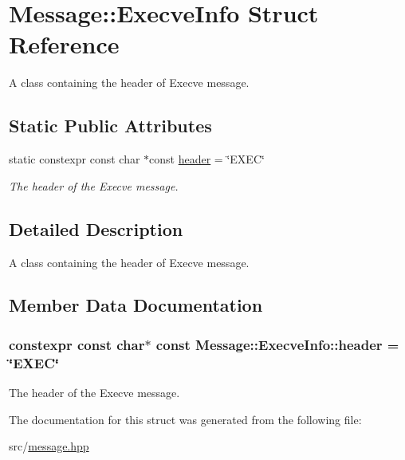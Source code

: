 \hypertarget{struct_message_1_1_execve_info}{\section{Message\-:\-:Execve\-Info Struct Reference}
\label{struct_message_1_1_execve_info}
}


A class containing the header of Execve message.  


\subsection*{Static Public Attributes}
\begin{DoxyCompactItemize}
\item 
static constexpr const char $\ast$const \hyperlink{struct_message_1_1_execve_info_a44d41c7c7b15356bd30404850d8b90f7}{header} = \char`\"{}E\-X\-E\-C\char`\"{}
\begin{DoxyCompactList}\small\item\em The header of the Execve message. \end{DoxyCompactList}\end{DoxyCompactItemize}


\subsection{Detailed Description}
A class containing the header of Execve message. 

\subsection{Member Data Documentation}
\hypertarget{struct_message_1_1_execve_info_a44d41c7c7b15356bd30404850d8b90f7}{
\subsubsection[{header}]{\setlength{\rightskip}{0pt plus 5cm}constexpr const char$\ast$ const Message\-::\-Execve\-Info\-::header = \char`\"{}E\-X\-E\-C\char`\"{}\hspace{0.3cm}{\ttfamily [static]}}}\label{struct_message_1_1_execve_info_a44d41c7c7b15356bd30404850d8b90f7}


The header of the Execve message. 



The documentation for this struct was generated from the following file\-:\begin{DoxyCompactItemize}
\item 
src/\hyperlink{message_8hpp}{message.\-hpp}\end{DoxyCompactItemize}

